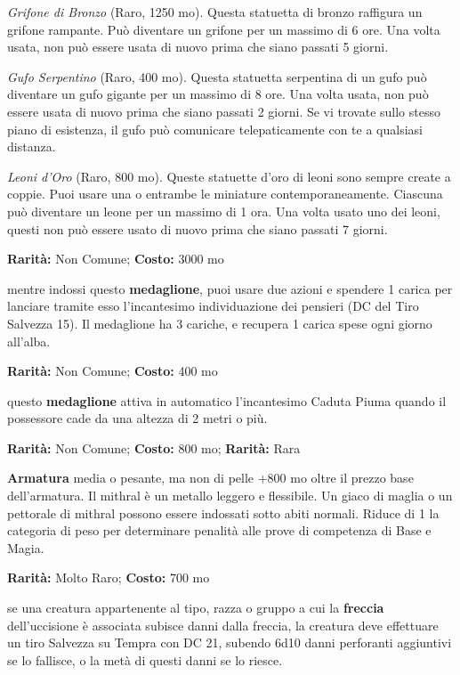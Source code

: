 \begin{multicols}{2}
\emph{Grifone di Bronzo} (Raro, 1250 mo). Questa statuetta di bronzo raffigura un grifone rampante. Può diventare un grifone per un massimo di 6 ore. Una volta usata, non può essere usata di nuovo prima che siano passati 5 giorni.

\emph{Gufo Serpentino} (Raro, 400 mo). Questa statuetta serpentina di un gufo può diventare un gufo gigante per un massimo di 8 ore. Una volta usata, non può essere usata di nuovo prima che siano passati 2 giorni. Se vi trovate sullo stesso piano di esistenza, il gufo può comunicare telepaticamente con te a qualsiasi distanza.

\emph{Leoni d'Oro} (Raro, 800 mo). Queste statuette d'oro di leoni sono sempre create a coppie. Puoi usare una o entrambe le miniature contemporaneamente. Ciascuna può diventare un leone per un massimo di 1 ora. Una volta usato uno dei leoni, questi non può essere usato di nuovo prima che siano passati 7 giorni.


\textbf{Rarità:} Non Comune; \textbf{Costo:} 3000 mo

mentre indossi questo \textbf{medaglione}, puoi usare due azioni e spendere 1 carica per lanciare tramite esso l'incantesimo individuazione dei pensieri (DC del Tiro Salvezza 15). Il medaglione ha 3 cariche, e recupera 1 carica spese ogni giorno all'alba.


\textbf{Rarità:} Non Comune; \textbf{Costo:} 400 mo

questo \textbf{medaglione} attiva in automatico l'incantesimo Caduta Piuma quando il possessore cade da una altezza di 2 metri o più.


\textbf{Rarità:} Non Comune; \textbf{Costo:} 800 mo; \textbf{Rarità:} Rara

\textbf{Armatura} media o pesante, ma non di pelle +800 mo oltre il prezzo base dell'armatura. Il mithral è un metallo leggero e flessibile. Un giaco di maglia o un pettorale di mithral possono essere indossati sotto abiti normali. Riduce di 1 la categoria di peso per determinare penalità alle prove di competenza di Base e Magia.


\textbf{Rarità:} Molto Raro; \textbf{Costo:} 700 mo

se una creatura appartenente al tipo, razza o gruppo a cui la \textbf{freccia} dell'uccisione è associata subisce danni dalla freccia, la creatura deve effettuare un tiro Salvezza su Tempra con DC 21, subendo 6d10 danni perforanti aggiuntivi se lo fallisce, o la metà di questi danni se lo riesce.


\end{multicols}
